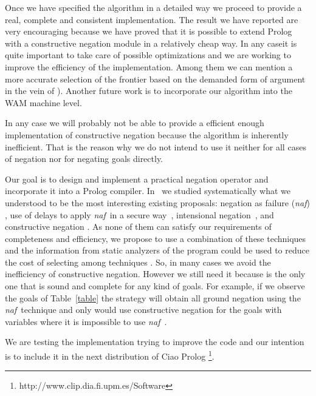 \documentclass{llncs}
\newcommand{\naf}{{\em naf}}\newcommand{\viejo}[1]{}
\begin{document}
Once we have specified the algorithm in a detailed way we proceed to
provide a real, complete and consistent implementation. The result we
have reported are very encouraging because we have proved that it is
possible to extend Prolog with a constructive negation module in a
relatively cheap way.  In any caseit is quite important to take care
of possible optimizations and we are working to improve the efficiency
of the implementation. Among them we can mention a more accurate
selection of the frontier based on the demanded form of argument in
the vein of \cite{Moreno2}). Another future work is to incorporate our
algorithm into the WAM machine level.

In any case we will probably not be able to provide a efficient enough
implementation of constructive negation because the algorithm is
inherently inefficient.  That is the reason why we do not intend to
use it neither for all cases of negation nor for negating goals
directly.

Our goal is to design and implement a practical negation operator and
incorporate it into a Prolog compiler.
In~\cite{SusanaPADL2000,SusanaLPAR01} we studied systematically what
we understood to be the most interesting existing proposals: negation
as failure (\naf) \cite{Clark}, use of delays to apply \naf\ in a
secure way~\cite{naish:lncs}, intensional
negation~\cite{Barbuti1,Barbuti2}, and constructive negation
\cite{Chan1,Chan2,Drabent,Stuckey,Stuckey95}. As none of them can
satisfy our requirements of completeness and efficiency, we propose to
use a combination of these techniques and the information from static
analyzers of the program could be used to reduce the cost of selecting
among techniques \cite{SusanaLPAR01}. So, in many cases we avoid the
inefficiency of constructive negation. However we still need it
because is the only one that is sound and complete for any kind of
goals. For example, if we observe the goals of Table~\ref{table} the
strategy will obtain all ground negation using the \naf\ technique and
only would use constructive negation for the goals with variables
where it is impossible to use \naf\ .

We are testing the implementation trying to improve the code and our
intention is to include it in the next distribution of Ciao Prolog
\footnote{http://www.clip.dia.fi.upm.es/Software}.
  


 \begin{small}

     
    

 \end{small}


\end{document}
